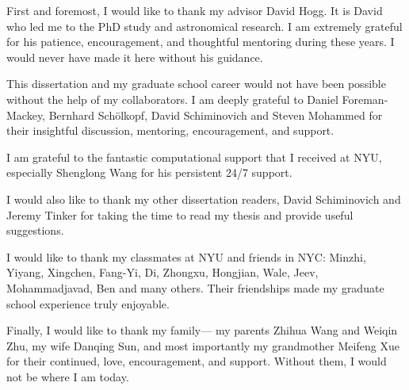 First and foremost, I would like to thank my advisor David Hogg.
It is David who led me to the PhD study and astronomical research.
I am extremely grateful for his patience, encouragement, and thoughtful mentoring during these years.
I would never have made it here without his guidance.

This dissertation and my graduate school career would not have been possible without the help of my collaborators.
I am deeply grateful to Daniel Foreman-Mackey, Bernhard Sch\"olkopf, David Schiminovich and Steven Mohammed for their insightful discussion, mentoring, encouragement, and support.

I am grateful to the fantastic computational support that I received at NYU, especially Shenglong Wang for his persistent 24/7 support.

I would also like to thank my other dissertation readers, David Schiminovich and Jeremy Tinker for taking the time to read my thesis and provide useful suggestions.

I would like to thank my classmates at NYU and friends in NYC:
Minzhi, Yiyang, Xingchen, Fang-Yi, Di, Zhongxu, Hongjian, Wale, Jeev, Mohammadjavad, Ben and many others.
Their friendships made my graduate school experience truly enjoyable.

Finally, I would like to thank my family---
my parents Zhihua Wang and Weiqin Zhu, 
my wife Danqing Sun, 
and most importantly my grandmother Meifeng Xue
for their continued, love, encouragement, and support.
Without them, I would not be where I am today.
